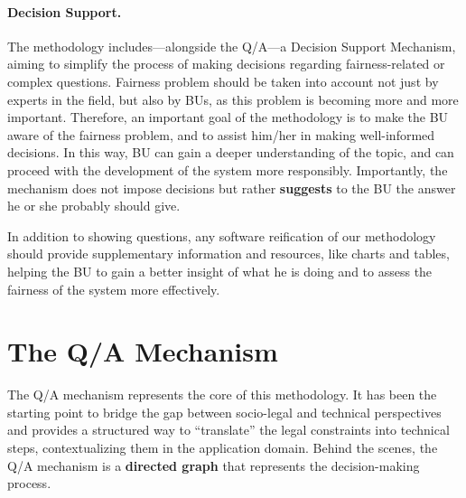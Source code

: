 \documentclass[12pt,a4paper,openright,twoside]{book}
\begin{document}
\paragraph{Decision Support.}
The methodology includes---alongside the \ac{Q/A}---a Decision Support Mechanism, aiming to simplify the process of making decisions regarding fairness-related or complex questions.
%
Fairness problem should be taken into account not just by experts in the field, but also by \acp{BU}, as this problem is becoming more and more important.
%
Therefore, an important goal of the methodology is to make the \ac{BU} aware of the fairness problem, and to assist him/her in making well-informed decisions.
%
In this way, \ac{BU} can gain a deeper understanding of the topic, and can proceed with the development of the system more responsibly.
%
Importantly, the mechanism does not impose decisions but rather \textbf{suggests} to the \ac{BU} the answer he or she probably should give.

In addition to showing questions, any software reification of our methodology should provide supplementary information and resources, like charts and tables, helping the \ac{BU} to gain a better insight of what he is doing and to assess the fairness of the system more effectively.


\section{The \acs{Q/A} Mechanism}\label{sec:qa-mechanism}

The \acf{Q/A} mechanism represents the core of this methodology.
%
It has been the starting point to bridge the gap between socio-legal and technical perspectives and provides a structured way to ``translate'' the legal constraints into technical steps, contextualizing them in the application domain.
%
Behind the scenes, the \ac{Q/A} mechanism is a \textbf{directed graph} that represents the decision-making process.

\end{document}

